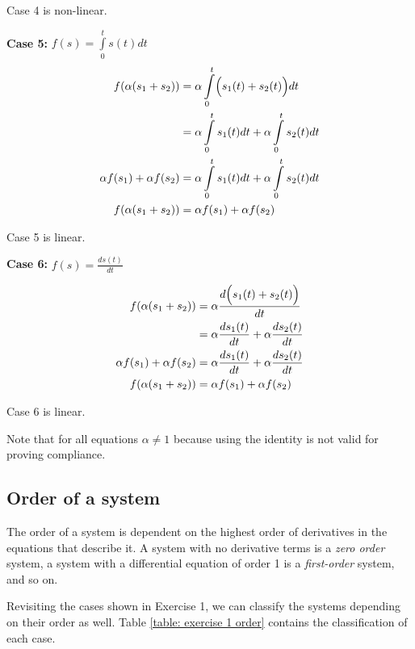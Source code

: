 Case 4 is non-linear.


\textbf{Case 5:} $f(s) = \int\limits_0^t s(t)dt$
\begin{equation*}
 \begin{split}
f(\alpha (s_1 + s_2))  & = \alpha \int\limits_0^t 
\Bigl( s_1(t)+s_2(t) \Bigr)  dt\\
& = \alpha \int\limits_0^t 
s_1(t)dt + \alpha \int\limits_0^t 
s_2(t)dt\\
\alpha f(s_1) + \alpha f(s_2) & = \alpha \int\limits_0^t 
s_1(t)dt + \alpha \int\limits_0^t 
s_2(t)dt\\
f(\alpha (s_1+s_2))  & = \alpha f(s_1) + \alpha f(s_2)
 \end{split}
\end{equation*}

Case 5 is linear.


\textbf{Case 6:} $f(s) = \frac{ds(t)}{dt}$

\begin{equation*}
 \begin{split}
f(\alpha (s_1 + s_2))  & =  \alpha 
\frac{d \Bigl (s_1(t)+s_2(t) \Bigr)}{dt}\\
& = \alpha \frac{d s_1(t)}{dt} + \alpha \frac{d 
s_2(t)}{dt} \\
\alpha f(s_1) + \alpha f(s_2) & = \alpha \frac{d s_1(t)}{dt} 
+ \alpha \frac{d s_2(t)}{dt} \\
f(\alpha (s_1+s_2))  & = \alpha f(s_1) + \alpha f(s_2)
 \end{split}
\end{equation*}

Case 6 is linear.

Note that for all equations $\alpha \neq 1$ because using 
the identity is not valid for proving compliance.

\subsection{Order of a system}

The order of a system is dependent on the highest order of 
derivatives in the equations that describe it. A system 
with no derivative terms is a \emph{zero order} system, a 
system with a differential equation of order 1 is a 
\emph{first-order} system, and so on.

Revisiting the cases shown in Exercise 1, we can classify 
the systems depending on their order as well. Table 
\ref{table: exercise 1 order} contains the classification 
of each case.

